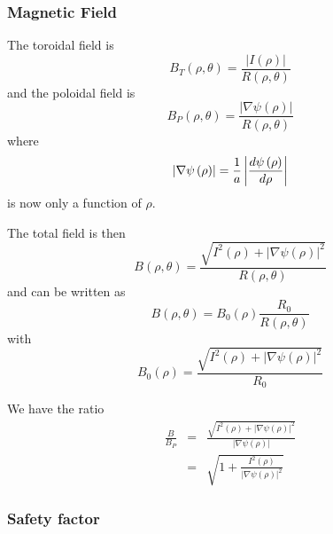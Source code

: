 \documentclass{article}
\begin{document}
\subsubsection{Magnetic Field}

The toroidal field is 
\begin{equation}
B_{T}\left( \rho ,\theta \right) =\frac{\left| I\left( \rho \right) \right| 
}{R\left( \rho ,\theta \right) }
\end{equation}
and the poloidal field is 
\begin{equation}
B_{P}\left( \rho ,\theta \right) =\frac{\left| \nabla \psi \left( \rho
\right) \right| }{R\left( \rho ,\theta \right) }  \label{Bpcirc}
\end{equation}
where 
\begin{equation}
\left| \nabla \psi \left( \rho \right) \right| =\frac{1}{a}\left| \frac{%
d\psi \left( \rho \right) }{d\rho }\right| 
\end{equation}
is now only a function of $\rho $.

The total field is then 
\begin{equation}
B\left( \rho ,\theta \right) =\frac{\sqrt{I^{2}\left( \rho \right) +\left|
\nabla \psi \left( \rho \right) \right| ^{2}}}{R\left( \rho ,\theta \right) }
\end{equation}
and can be written as 
\begin{equation}
B\left( \rho ,\theta \right) =B_{0}\left( \rho \right) \frac{R_{0}}{R\left(
\rho ,\theta \right) }  \label{Bcirc}
\end{equation}
with 
\begin{equation}
B_{0}\left( \rho \right) =\frac{\sqrt{I^{2}\left( \rho \right) +\left|
\nabla \psi \left( \rho \right) \right| ^{2}}}{R_{0}}
\end{equation}

We have the ratio 
\begin{eqnarray}
\frac{B}{B_{P}} &=&\frac{\sqrt{I^{2}\left( \rho \right) +\left| \nabla \psi
\left( \rho \right) \right| ^{2}}}{\left| \nabla \psi \left( \rho \right)
\right| }  \label{BsBpcirc} \\
&=&\sqrt{1+\frac{I^{2}\left( \rho \right) }{\left| \nabla \psi \left( \rho
\right) \right| ^{2}}}
\end{eqnarray}

\subsubsection{Safety factor}
\end{document}
